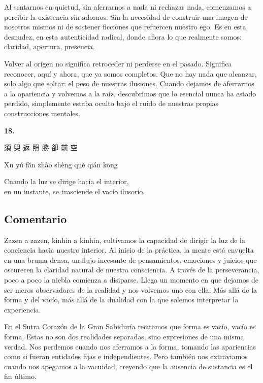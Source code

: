 \documentclass[
  a5paperpaper,
]{article}
\begin{document}
Al sentarnos en quietud, sin aferrarnos a nada ni rechazar nada,
comenzamos a percibir la existencia sin adornos. Sin la necesidad de
construir una imagen de nosotros mismos ni de sostener ficciones que
refuercen nuestro ego. Es en esta desnudez, en esta autenticidad
radical, donde aflora lo que realmente somos: claridad, apertura,
presencia.

Volver al origen no significa retroceder ni perderse en el pasado.
Significa reconocer, aquí y ahora, que ya somos completos. Que no hay
nada que alcanzar, solo algo que soltar: el peso de nuestras ilusiones.
Cuando dejamos de aferrarnos a la apariencia y volvemos a la raíz,
descubrimos que lo esencial nunca ha estado perdido, simplemente estaba
oculto bajo el ruido de nuestras propias construcciones mentales.

\hfill\break

\hypertarget{03}{}
\begin{verseblock}

\newpage

\begin{center}\textbf{18.}\end{center}

須 臾 返 照 勝 卻 前 空

Xū yú făn zhào shèng què qián kōng

Cuando la luz se dirige hacia el interior,\\
en un instante, se trasciende el vacío ilusorio.

\end{verseblock}

\hfill\break

\hypertarget{comentario-17}{%
\subsection{Comentario}\label{comentario-17}}

Zazen a zazen, kinhin a kinhin, cultivamos la capacidad de dirigir la
luz de la conciencia hacia nuestro interior. Al inicio de la práctica,
la mente está envuelta en una bruma densa, un flujo incesante de
pensamientos, emociones y juicios que oscurecen la claridad natural de
nuestra consciencia. A través de la perseverancia, poco a poco la niebla
comienza a disiparse. Llega un momento en que dejamos de ser meros
observadores de la realidad y nos volvemos uno con ella. Más allá de la
forma y del vacío, más allá de la dualidad con la que solemos
interpretar la experiencia.

En el Sutra Corazón de la Gran Sabiduría recitamos que forma es vacío,
vacío es forma. Estas no son dos realidades separadas, sino expresiones
de una misma verdad. Nos perdemos cuando nos aferramos a la forma,
tomando las apariencias como si fueran entidades fijas e independientes.
Pero también nos extraviamos cuando nos apegamos a la vacuidad, creyendo
que la ausencia de sustancia es el fin último.
\end{document}
